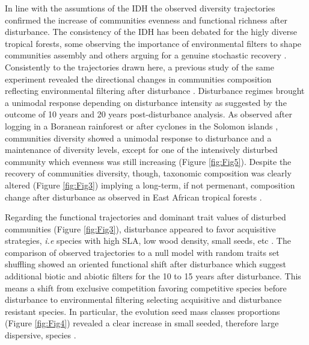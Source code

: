 \documentclass[fleqn,10pt]{ArtEcoFoG} %
\theoremstyle{definition}
\theoremstyle{definition}
\theoremstyle{definition}
\theoremstyle{remark}
\begin{document}
In line with the assumtions of the IDH the observed diversity
trajectories confirmed the increase of communities evenness and
functional richness after disturbance. The consistency of the IDH has
been debated for the higly diverse tropical forests, some observing the
importance of environmental filters to shape communities assembly and
others arguing for a genuine stochastic recovery
\citep{Hubbell1999, Molino2001}. Consistently to the trajectories drawn
here, a previous study of the same experiment revealed the directional
changes in communities composition reflecting environmental filtering
after disturbance \citep{Molino2001}. Disturbance regimes brought a
unimodal response depending on disturbance intensity as suggested by the
outcome of 10 years and 20 years post-disturbance
analysis\citep{Molino2001, Baraloto2012a}. As observed after logging in
a Boranean rainforest \citep{Cannon1998} or after cyclones in the
Solomon islands \citep{Burslem2000}, communities diversity showed a
unimodal response to disturbance and a maintenance of diversity levels,
except for one of the intensively disturbed community which evenness was
still increasing (Figure \ref{fig:Fig5}). Despite the recovery of
communities diversity, though, taxonomic composition was clearly altered
(Figure \ref{fig:Fig3}) implying a long-term, if not permenant,
composition change after disturbance as observed in East African
tropical forests \citep{Bonnell2011}.

Regarding the functional trajectories and dominant trait values of
disturbed communities (Figure \ref{fig:Fig3}), disturbance appeared to
favor acquisitive strategies, \emph{i.e} species with high SLA, low wood
density, small seeds, etc \citep{Westoby1998, Wright2004, Reich2014}.
The comparison of observed trajectories to a null model with random
traits set shuffling showed an oriented functional shift after
disturbance which suggest additional biotic and abiotic filters for the
10 to 15 years after disturbance. This means a shift from exclusive
competition favoring competitive species before disturbance to
environmental filtering selecting acquisitive and disturbance resistant
species. In particular, the evolution seed mass classes proportions
(Figure \ref{fig:Fig4}) revealed a clear increase in small seeded,
therefore large dispersive, species
\citep{TerSteege2001, Flores2006, Haddad2008}.
\end{document}

